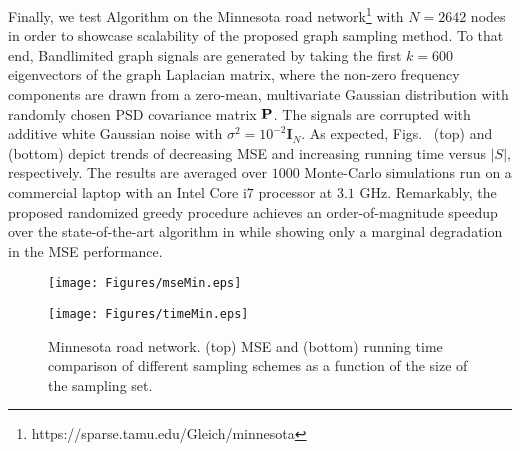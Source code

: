 Finally, we test Algorithm  on the Minnesota road network\footnote{https://sparse.tamu.edu/Gleich/minnesota} with $N=2642$ nodes in order to showcase scalability of the proposed graph sampling method. To that end, Bandlimited graph signals are generated by taking the first $k=600$ eigenvectors of the graph Laplacian matrix, where the non-zero frequency components are drawn from a zero-mean, multivariate Gaussian distribution with randomly chosen PSD covariance matrix $\P$. The signals are corrupted with additive white Gaussian noise with $\sigma^{2}=10^{-2} \mathbf{I}_{N}$. 
As expected, Figs.~ (top) and (bottom) depict trends of decreasing MSE and increasing running time versus $|S|$, respectively. The results are averaged over $1000$ Monte-Carlo simulations run on a commercial laptop with an Intel Core i$7$ processor at $3.1$ GHz. Remarkably, the proposed randomized greedy procedure achieves an order-of-magnitude speedup over the state-of-the-art algorithm in \cite{chamon2017greedy} while showing only a marginal degradation in the MSE performance.
%
\begin{figure}[t]
	\vspace{-0.3cm}
	\begin{minipage}[b]{\linewidth}
		\centering
		\texttt{[image: Figures/mseMin.eps]}
	\end{minipage}
	\begin{minipage}[b]{\linewidth}
		\centering
		\texttt{[image: Figures/timeMin.eps]}
	\end{minipage}
	\vspace{-0.5cm}	
	\caption{Minnesota road network. (top) MSE and (bottom) running time comparison of different sampling schemes as a function of the size of the sampling set.}
	\label{fig:min}
	\vspace{-0.3cm}
\end{figure}
